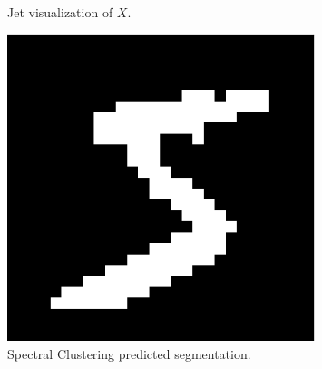\documentclass{beamer}
\begin{document}
\begin{frame}
\begin{figure}[H]
\begin{minipage}[t]{0.3\linewidth}
		\caption{\small Jet visualization of $X$.}
	\end{minipage}
	\hspace{.1cm}
	\begin{minipage}[t]{0.3\linewidth}
		\centering
		\includegraphics[width=0.8\textwidth]{img/advrows/5y.png}
		\caption{\small Spectral Clustering predicted segmentation.}
	\end{minipage}
\end{figure}


\end{frame}
\end{document}
